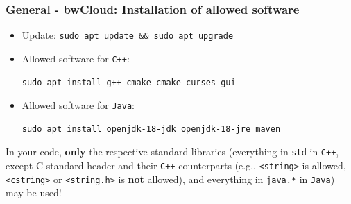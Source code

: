 \begin{frame}[fragile]
  \frametitle{General - bwCloud: Installation of allowed software}
    \begin{itemize}
        \item Update: \texttt{sudo apt update && sudo apt upgrade} \vspace{.5em}

        \item Allowed software for \texttt{C++}:\vspace*{-.2em}
        \begin{verbatim}
sudo apt install g++ cmake cmake-curses-gui
        \end{verbatim}

        \pause
        \item Allowed software for \texttt{Java}:\vspace*{-.2em}
        \begin{verbatim}
sudo apt install openjdk-18-jdk openjdk-18-jre maven
        \end{verbatim}
    \end{itemize}
    \vfill
    In your code, \textbf{only} the respective standard libraries (everything in \texttt{std} in \texttt{C++}, except C standard header and their \texttt{C++} counterparts (e.g., \texttt{<string>} is allowed, \texttt{<cstring>} or \texttt{<string.h>} is \textbf{not} allowed), and everything in \texttt{java.*} in \texttt{Java}) may be used!
\end{frame}

